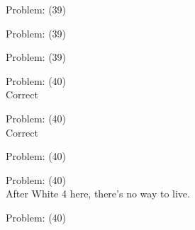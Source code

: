 \documentclass[11pt]{article}
\begin{document}
\begin{minipage}[t]{0.5\textwidth}
  {\centering
  
  Problem: (39)\\
  
  }
\end{minipage}
\begin{minipage}[t]{0.5\textwidth}
  {\centering
  
  Problem: (39)\\
  
  }
\end{minipage}
\begin{minipage}[t]{0.5\textwidth}
  {\centering
  
  Problem: (39)\\
  
  }
\end{minipage}
\begin{minipage}[t]{0.5\textwidth}
  {\centering
  
  Problem: (40)\\
  Correct\\
  }
\end{minipage}
\begin{minipage}[t]{0.5\textwidth}
  {\centering
  
  Problem: (40)\\
  Correct\\
  }
\end{minipage}
\begin{minipage}[t]{0.5\textwidth}
  {\centering
  
  Problem: (40)\\
  
  }
\end{minipage}
\begin{minipage}[t]{0.5\textwidth}
  {\centering
  
  Problem: (40)\\
  After White 4 here, there's no way to live.\\
  }
\end{minipage}
\begin{minipage}[t]{0.5\textwidth}
  {\centering
  
  Problem: (40)\\
  
  }
\end{minipage}
\end{document}
